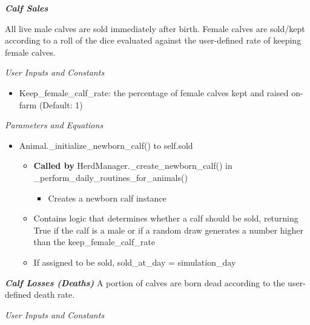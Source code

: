 \begin{refsection}
    \textbf{\textit{Calf Sales}}
    \vspace{0.2cm}     

    All live male calves are sold immediately after birth. Female calves are sold/kept according to a roll of the dice evaluated against the user-defined rate of keeping female calves.
        \vspace{0.2cm}
        
         \textit{User Inputs and Constants}
         \vspace{0.1cm}

         \begin{itemize}
             \item Keep\_female\_calf\_rate: the percentage of female calves kept and raised on-farm (Default: 1)

         \end{itemize}

         
         \textit{Parameters and Equations}
         \vspace{0.1cm}

         \begin{itemize}
             \item Animal.\_initialize\_newborn\_calf() to self.sold
            \begin{itemize}
                \item \textbf{Called by} HerdManager.\_create\_newborn\_calf() in \_perform\_daily\_routines\_for\_animals()
                \begin{itemize}
                    \item Creates a newborn calf instance 
                \end{itemize}
                \item Contains logic that determines whether a calf should be sold, returning True if the calf is a male or if a random draw generates a number higher than the keep\_female\_calf\_rate 
                \item If assigned to be sold, sold\_at\_day = simulation\_day 
            \end{itemize}
         \end{itemize}






    \textbf{\textit{Calf Losses (Deaths)}} A portion of calves are born dead according to the user-defined death rate. 
    \vspace{0.2cm}

         \textit{User Inputs and Constants}
         \vspace{0.1cm}


\end{refsection}

